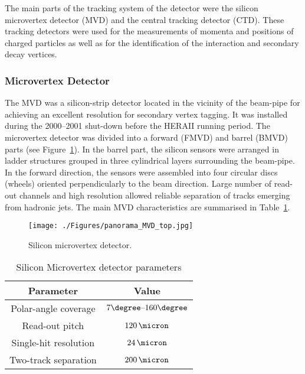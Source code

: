 The main parts of the tracking system of the \zeus detector were the silicon microvertex detector (MVD) and the central tracking detector (CTD). These tracking detectors were used for the measurements of momenta and positions of charged particles as well as for the identification of the interaction and secondary decay vertices.

\subsubsection{Microvertex Detector}
\label{subsubsec:mvd}
The MVD was a silicon-strip detector located in the vicinity of the beam-pipe for achieving an excellent resolution for secondary vertex tagging. It was installed during the 2000--2001 shut-down before the HERAII running period. The microvertex detector was divided into a forward (FMVD) and barrel (BMVD) parts (see Figure~\ref{fig:MVD_artistic}). In the barrel part, the silicon sensors were arranged in ladder structures grouped in three cylindrical layers surrounding the beam-pipe. In the forward direction, the sensors were assembled into four circular discs (wheels) oriented perpendicularly to the beam direction. Large number of read-out channels and high resolution allowed reliable separation of tracks emerging from hadronic jets. The main MVD characteristics are summarised in Table~\ref{tab:mvdgeomparameters}. 

\begin{figure}[htbp]
	\centering
		\texttt{[image: ./Figures/panorama\_MVD\_top.jpg]}
	\caption{Silicon microvertex detector.}
	\label{fig:MVD_artistic}
\end{figure}

\begin{table}[htbp]
	\centering
\begin{tabular}{ | c | c | }
     \hline
      Parameter & Value \\
			\hline
			\hline
			Polar-angle coverage & $7\degree \mbox{--} 160\degree$ \\ \hline
      Read-out pitch & $120\,\micron$  \\ \hline
			Single-hit resolution & $24\,\micron$ \\ \hline 
			Two-track separation & $200\,\micron$ \\
      \hline
     \end{tabular}
	\caption{Silicon Microvertex detector parameters}
	\label{tab:mvdgeomparameters}
\end{table}

